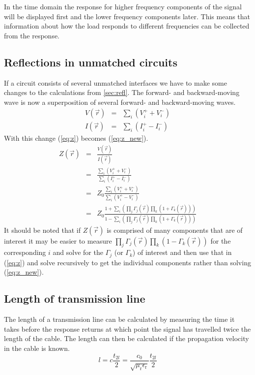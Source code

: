 \documentclass[12pt,a4paper]{article}
\begin{document}
In the time domain the response for higher frequency components of the signal will be displayed first and the lower frequency components later. This means that information about how the load responds to different frequencies can be collected from the response.


\subsection{Reflections in unmatched circuits}\label{sec:unmatched}
If a circuit consists of several unmatched interfaces we have to make some changes to the calculations from \ref{sec:refl}. The forward- and backward-moving wave is now a superposition of several forward- and backward-moving waves.
\begin{equation}
  \begin{array}{lll}
    V(\vec{r}) & = & \displaystyle\sum_{i}(V^{+}_{i}+V^{-}_{i}) \\
    I(\vec{r})& = & \displaystyle\sum_{i}(I^{+}_{i}-I^{-}_{i})
  \end{array}
\end{equation}
With this change (\ref{eq:z}) becomes (\ref{eq:z_new}).
\begin{equation}
  \begin{array}{lll}
    Z(\vec{r}) & = & \frac{V(\vec{r})}{I(\vec{r})} \\
               & = & \frac{\sum_{i}(V^{+}_{i}+V^{-}_{i})}{\sum_{i}(I^{+}_{i}-I^{-}_{i})} \\
               & = & Z_{0}\frac{\sum_{i}(V^{+}_{i}+V^{-}_{i})}{\sum_{i}(V^{+}_{i}-V^{-}_{i})} \\
     & = & Z_{0}\frac{1+\sum_{i}(\prod_{j}\Gamma_{j}(\vec{r})\prod_{k}(1+\Gamma_{k}(\vec{r})))}{1-\sum_{i}(\prod_{j}\Gamma_{j}(\vec{r})\prod_{k}(1+\Gamma_{k}(\vec{r})))}
  \end{array}
  \label{eq:z_new}
\end{equation}
It should be noted that if $Z(\vec{r})$ is comprised of many components that are of interest it may be easier to measure $\prod_{j}\Gamma_{j}(\vec{r})\prod_{k}(1-\Gamma_{k}(\vec{r}))$ for the corresponding $i$ and solve for the $\Gamma_{j}$ (or $\Gamma_{k}$) of interest and then use that in (\ref{eq:z}) and solve recursively to get the individual components rather than solving (\ref{eq:z_new}).

\subsection{Length of transmission line}
The length of a transmission line can be calculated by measuring the time it takes before the response returns at which point the signal has travelled twice the length of the cable. The length can then be calculated if the propagation velocity in the cable is known.
\begin{equation}
  l=c\frac{t_{2l}}{2}=\frac{c_{0}}{\sqrt{\mu_{\text{r}}\epsilon_{\text{r}}}}\frac{t_{2l}}{2}
  \label{eq:cablen}
\end{equation}
\end{document}
